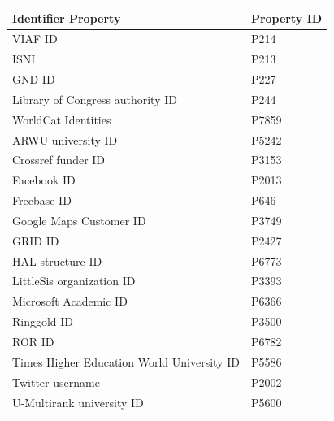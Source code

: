 \begin{doublespace}
\begin{table}[h!]
  	\begin{tabular}{|l|l|} \hline
	Identifier Property \ & Property ID \\ \hline
    VIAF ID & P214\\ \hline
    ISNI & P213\\ \hline
    GND ID & P227\\ \hline
    Library of Congress authority ID & P244\\ \hline
             WorldCat Identities & P7859\\ \hline
             ARWU university ID & P5242\\ \hline
             Crossref funder ID & P3153\\ \hline
             Facebook ID & P2013\\ \hline
             Freebase ID & P646\\ \hline
             Google Maps Customer ID & P3749\\ \hline
             GRID ID & P2427\\ \hline
             HAL structure ID & P6773\\ \hline
             LittleSis organization ID & P3393\\ \hline
             Microsoft Academic ID & P6366\\ \hline
             Ringgold ID & P3500\\ \hline
             ROR ID & P6782\\ \hline
             Times Higher Education World University ID & P5586\\ \hline
             Twitter username & P2002\\ \hline
             U-Multirank university ID & P5600\\ \hline
	\end{tabular}
 \end{table}


\end{doublespace}
